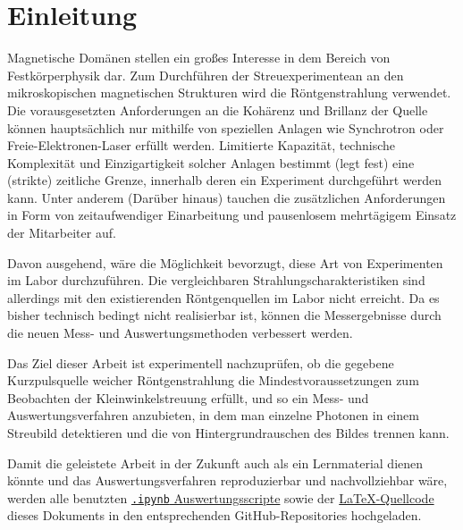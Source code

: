 \chapter{Einleitung}
\label{text:einleitung}
Magnetische Domänen stellen ein großes Interesse in dem Bereich von Festkörperphysik dar. Zum Durchführen der Streuexperimentean an den mikroskopischen magnetischen Strukturen wird die Röntgenstrahlung verwendet. Die vorausgesetzten Anforderungen an die Kohärenz und Brillanz der Quelle können hauptsächlich nur mithilfe von speziellen Anlagen wie Synchrotron oder Freie-Elektronen-Laser erfüllt werden. Limitierte Kapazität, technische Komplexität und Einzigartigkeit solcher Anlagen bestimmt (legt fest) eine (strikte) zeitliche Grenze, innerhalb deren ein Experiment durchgeführt werden kann. Unter anderem (Darüber hinaus) tauchen die zusätzlichen Anforderungen in Form von zeitaufwendiger Einarbeitung und pausenlosem mehrtägigem Einsatz der Mitarbeiter auf.

\noindent
Davon ausgehend, wäre die Möglichkeit bevorzugt, diese Art von Experimenten im Labor durchzuführen. Die vergleichbaren Strahlungscharakteristiken  sind allerdings mit den existierenden Röntgenquellen im Labor nicht erreicht. Da es bisher technisch bedingt nicht realisierbar ist, können die Messergebnisse durch die neuen Mess- und Auswertungsmethoden verbessert werden.

\noindent
Das Ziel dieser Arbeit ist experimentell nachzuprüfen, ob die gegebene Kurzpulsquelle weicher Röntgenstrahlung die Mindestvoraussetzungen zum Beobachten der Kleinwinkelstreuung erfüllt, und so ein Mess- und Auswertungsverfahren anzubieten, in dem man einzelne Photonen in einem Streubild detektieren und die von Hintergrundrauschen des Bildes trennen kann.

\noindent
Damit die geleistete Arbeit in der Zukunft auch als ein Lernmaterial dienen könnte und das Auswertungsverfahren reproduzierbar und nachvollziehbar wäre, werden alle benutzten \href{https://github.com/lrlunin/bachelorarbeit_python_notebooks_and_data/}{\color{blue}\texttt{.ipynb} Auswertungsscripte} sowie der \href{https://github.com/lrlunin/Bachelorarbeit/}{\color{blue}\LaTeX-Quellcode} dieses Dokuments in den entsprechenden GitHub-Repositories hochgeladen.   


